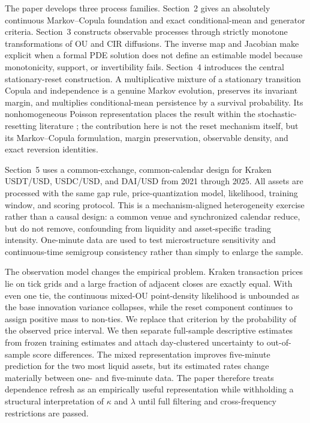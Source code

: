 The paper develops three process families.  Section~2 gives an absolutely
continuous Markov--Copula foundation and exact conditional-mean and generator
criteria.  Section~3 constructs observable processes through strictly
monotone transformations of OU and CIR diffusions.  The inverse map and
Jacobian make explicit when a formal PDE solution does not define an
estimable model because monotonicity, support, or invertibility fails.
Section~4 introduces the central stationary-reset construction.  A
multiplicative mixture of a stationary transition Copula and independence is
a genuine Markov evolution, preserves its invariant margin, and multiplies
conditional-mean persistence by a survival probability.  Its nonhomogeneous
Poisson representation places the result within the stochastic-resetting
literature \citep{EvansMajumdar2011,EvansMajumdarSchehr2020}; the contribution
here is not the reset mechanism itself, but its Markov--Copula formulation,
margin preservation, observable density, and exact reversion identities.

Section~5 uses a common-exchange, common-calendar design for Kraken USDT/USD,
USDC/USD, and DAI/USD from 2021 through 2025.  All assets are processed with
the same gap rule, price-quantization model, likelihood, training window, and
scoring protocol.  This is a mechanism-aligned heterogeneity exercise rather
than a causal design: a common venue and synchronized calendar reduce, but do
not remove, confounding from liquidity and asset-specific trading intensity.
One-minute data are used to test microstructure sensitivity and continuous-time
semigroup consistency rather than simply to enlarge the sample.

The observation model changes the empirical problem.  Kraken transaction
prices lie on tick grids and a large fraction of adjacent closes are exactly
equal.  With even one tie, the continuous mixed-OU point-density likelihood is
unbounded as the base innovation variance collapses, while the reset component
continues to assign positive mass to non-ties.  We replace that criterion by
the probability of the observed price interval.  We then separate full-sample
descriptive estimates from frozen training estimates and attach day-clustered
uncertainty to out-of-sample score differences.  The mixed representation
improves five-minute prediction for the two most liquid assets, but its
estimated rates change materially between one- and five-minute data.  The
paper therefore treats dependence refresh as an empirically useful
representation while withholding a structural interpretation of
$\kappa$ and $\lambda$ until full filtering and cross-frequency restrictions
are passed.
